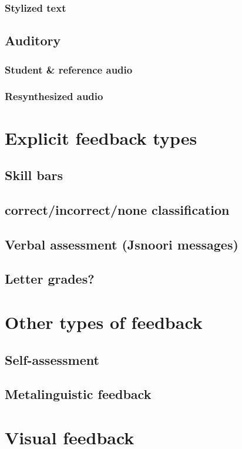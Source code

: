 			\subsubsection{Stylized text}
		\subsection{Auditory}
			\subsubsection{Student \& reference audio}
			\subsubsection{Resynthesized audio}
			
	\section{Explicit feedback types}
		\subsection{Skill bars}
		\subsection{correct/incorrect/none classification}
		\subsection{Verbal assessment (Jsnoori messages)}
		\subsection{Letter grades?}
		
	\section{Other types of feedback}
		\subsection{Self-assessment}
		\subsection{Metalinguistic feedback}



\section{Visual feedback}
\label{sec:fb:visual}

